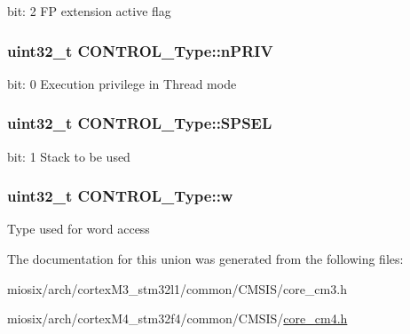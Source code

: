 bit\-: 2 F\-P extension active flag \hypertarget{union_c_o_n_t_r_o_l___type_a35c1732cf153b7b5c4bd321cf1de9605}{
\subsubsection[{n\-P\-R\-I\-V}]{\setlength{\rightskip}{0pt plus 5cm}uint32\-\_\-t C\-O\-N\-T\-R\-O\-L\-\_\-\-Type\-::n\-P\-R\-I\-V}}\label{union_c_o_n_t_r_o_l___type_a35c1732cf153b7b5c4bd321cf1de9605}
bit\-: 0 Execution privilege in Thread mode \hypertarget{union_c_o_n_t_r_o_l___type_a8cc085fea1c50a8bd9adea63931ee8e2}{
\subsubsection[{S\-P\-S\-E\-L}]{\setlength{\rightskip}{0pt plus 5cm}uint32\-\_\-t C\-O\-N\-T\-R\-O\-L\-\_\-\-Type\-::\-S\-P\-S\-E\-L}}\label{union_c_o_n_t_r_o_l___type_a8cc085fea1c50a8bd9adea63931ee8e2}
bit\-: 1 Stack to be used \hypertarget{union_c_o_n_t_r_o_l___type_a6b642cca3d96da660b1198c133ca2a1f}{
\subsubsection[{w}]{\setlength{\rightskip}{0pt plus 5cm}uint32\-\_\-t C\-O\-N\-T\-R\-O\-L\-\_\-\-Type\-::w}}\label{union_c_o_n_t_r_o_l___type_a6b642cca3d96da660b1198c133ca2a1f}
Type used for word access 

The documentation for this union was generated from the following files\-:\begin{DoxyCompactItemize}
\item 
miosix/arch/cortex\-M3\-\_\-stm32l1/common/\-C\-M\-S\-I\-S/core\-\_\-cm3.\-h\item 
miosix/arch/cortex\-M4\-\_\-stm32f4/common/\-C\-M\-S\-I\-S/\hyperlink{core__cm4_8h}{core\-\_\-cm4.\-h}\end{DoxyCompactItemize}

